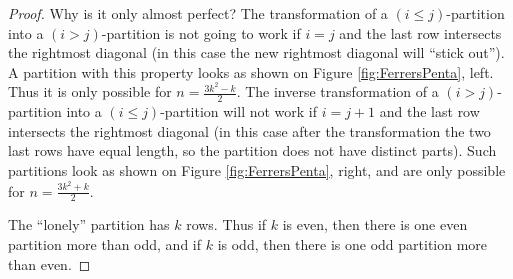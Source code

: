 \begin{proof}
Why is it only almost perfect?
The transformation of a $(i \le j)$-partition into a $(i > j)$-partition is not going to work if $i=j$ and the last row intersects the rightmost diagonal
(in this case the new rightmost diagonal will ``stick out'').
A partition with this property looks as shown on Figure \ref{fig:FerrersPenta}, left.
Thus it is only possible for $n = \frac{3k^2 - k}2$.
The inverse transformation of a $(i > j)$-partition into a $(i \le j)$-partition will not work
if $i = j+1$ and the last row intersects the rightmost diagonal
(in this case after the transformation the two last rows have equal length, so the partition does not have distinct parts).
Such partitions look as shown on Figure \ref{fig:FerrersPenta}, right, and are only possible for $n = \frac{3k^2 + k}2$.

The ``lonely'' partition has $k$ rows.
Thus if $k$ is even, then there is one even partition more than odd,
and if $k$ is odd, then there is one odd partition more than even.
\end{proof}




